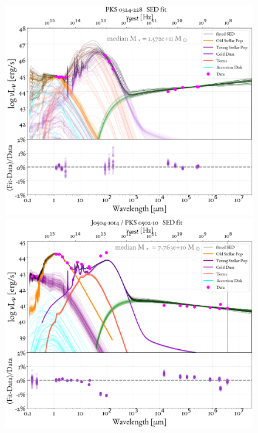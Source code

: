 \begin{figure}
    \centering
    \includegraphics[width=0.85\linewidth]{figures/ResultFits/16_SEDfit_1070.png}\\
    \includegraphics[width=0.85\linewidth]{figures/ResultFits/19_SEDfit_1765.png}  
\end{figure}
